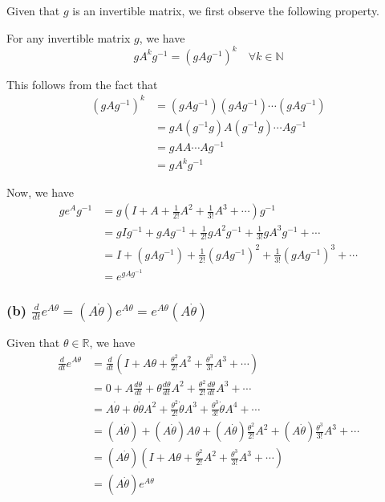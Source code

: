 Given that \( g \) is an invertible matrix, we first observe the following property.

For any invertible matrix \( g \), we have
\begin{equation*}
    g A^{k} g^{-1} = {(g A g^{-1})}^{k} \quad \forall k \in \mathbb{N}
\end{equation*}

This follows from the fact that
\begin{align*}
    {(g A g^{-1})}^{k}
     & =
    (g A g^{-1})(g A g^{-1})\cdots(g A g^{-1})
    \\ & =
    g A (g^{-1} g) A (g^{-1} g) \cdots A g^{-1}
    \\  & =
    g A A \cdots A g^{-1}
    \\ & =
    g A^{k} g^{-1}
\end{align*}

Now, we have
\begin{align*}
    g e^{A} g^{-1}
     & =
    g \left( I+A+\frac{1}{2 !}A^{2}+\frac{1}{3 !}A^{3}+\cdots \right) g^{-1}
    \\ & =
    g I g^{-1}+g A g^{-1}+\frac{1}{2 !}g A^{2} g^{-1}+\frac{1}{3 !}g A^{3} g^{-1}+\cdots
    \\ & =
    I+(g A g^{-1})+\frac{1}{2 !}{(g A g^{-1})}^{2}+\frac{1}{3 !}{(g A g^{-1})}^{3}+\cdots
    \\ & =
    e^{g A g^{-1}}
\end{align*}

\subsubsection*{(b) \( \displaystyle \frac{d}{d t} e^{A \theta}=(A\dot{\theta}) e^{A \theta}=e^{A \theta}(A \dot{\theta}) \)}

Given that \( \theta \in \mathbb{R} \), we have
\begin{align*}
    \frac{d}{d t} e^{A \theta}
     & =
    \frac{d}{d t} \left( I+A \theta+\frac{\theta^{2}}{2 !}A^{2}+\frac{\theta^{3}}{3 !}A^{3}+\cdots \right)
    \\ & =
    0+A \frac{d \theta}{d t}+\theta \frac{d \theta}{d t} A^{2}+\frac{\theta^{2}}{2 !} \frac{d \theta}{d t} A^{3}+\cdots
    \\ & =
    A \dot{\theta}+\theta \dot{\theta} A^2+\frac{\theta^{2}}{2 !} \dot{\theta} A^3+\frac{\theta^{3}}{3 !} \dot{\theta} A^4+\cdots
    \\ & =
    (A \dot{\theta})+(A \dot{\theta}) A\theta + (A \dot{\theta}) \frac{\theta^{2}}{2 !} A^{2}+(A \dot{\theta}) \frac{\theta^{3}}{3 !} A^{3}+\cdots
    \\ & =
    (A \dot{\theta}) \left( I+A \theta+\frac{\theta^{2}}{2 !}A^{2}+\frac{\theta^{3}}{3 !}A^{3}+\cdots \right)
    \\ & =
    (A \dot{\theta}) e^{A \theta}
\end{align*}

